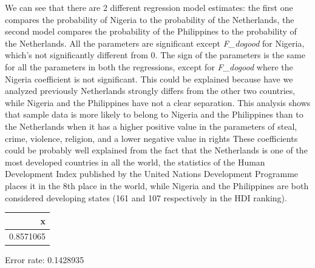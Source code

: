 \documentclass[
  11pt,
]{article}
\newenvironment{Shaded}{\begin{snugshade}}{\end{snugshade}}
\newcommand{\AttributeTok}[1]{\textcolor[rgb]{0.77,0.63,0.00}{#1}}
\newcommand{\DocumentationTok}[1]{\textcolor[rgb]{0.56,0.35,0.01}{\textbf{\textit{#1}}}}
\newcommand{\FunctionTok}[1]{\textcolor[rgb]{0.00,0.00,0.00}{#1}}
\newcommand{\NormalTok}[1]{#1}
\newcommand{\OtherTok}[1]{\textcolor[rgb]{0.56,0.35,0.01}{#1}}
\newcommand{\SpecialCharTok}[1]{\textcolor[rgb]{0.00,0.00,0.00}{#1}}
\begin{document}
We can see that there are 2 different regression model estimates: the first one compares the probability of Nigeria to the probability of the Netherlands, the second model compares the probability of the Philippines to the probability of the Netherlands.
All the parameters are significant except \emph{F\_dogood} for Nigeria, which's not significantly different from 0.
The sign of the parameters is the same for all the parameters in both the regressions, except for \emph{F\_dogood} where the Nigeria coefficient is not significant. This could be explained because have we analyzed previously Netherlands strongly differs from the other two countries, while Nigeria and the Philippines have not a clear separation.
This analysis shows that sample data is more likely to belong to Nigeria and the Philippines than to the Netherlands when it has a higher positive value in the parameters of steal, crime, violence, religion, and a lower negative value in rights
These coefficients could be probably well explained from the fact that the Netherlands is one of the most developed countries in all the world, the statistics of the Human Development Index published by the United Nations Development Programme places it in the 8th place in the world, while Nigeria and the Philippines are both considered developing states (161 and 107 respectively in the HDI ranking).

\begin{Shaded}
\end{Shaded}

\begin{tabular}[t]{r}
\hline
x\\
\hline
0.8571065\\
\hline
\end{tabular}

Error rate: 0.1428935
\end{document}
